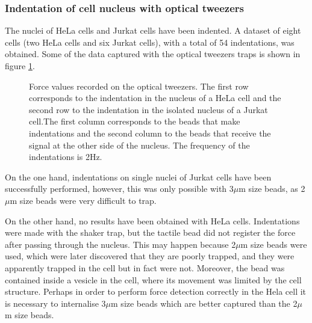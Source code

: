 \documentclass[12pt, a4paper]{article} %
\begin{document}
	\setlength{\parskip}{0mm}
	
	\subsubsection{Indentation of cell nucleus with optical tweezers}
	
	The nuclei of HeLa cells and Jurkat cells have been indented. A dataset of eight cells (two HeLa cells and six Jurkat cells), with a total of 54 indentations, was obtained. Some of the data captured with the optical tweezers traps is shown in figure \ref{fig:raw_data_cells}.
	
	\setlength{\parskip}{4mm}
	
	\begin{figure}[htbp]
		\centering
		
		\caption{Force values recorded on the optical tweezers. The first row corresponds to the indentation in the nucleus of a HeLa cell and the second row to the indentation in the isolated nucleus of a Jurkat cell.The first column corresponds to the beads that make indentations and the second column to the beads that receive the signal at the other side of the nucleus. The frequency of the indentations is 2Hz.}
		\label{fig:raw_data_cells}
	\end{figure}
	On the one hand, indentations on single nuclei of Jurkat cells have been successfully performed, however, this was only possible with 3$\mu$m size beads, as 2$\mu$m size beads were very difficult to trap. 
	
	On the other hand, no results have been obtained with HeLa cells. Indentations were made with the shaker trap, but the tactile bead did not register the force after passing through the nucleus. This may happen because 2$\mu$m size beads were used, which were later discovered that they are poorly trapped, and they were apparently trapped in the cell but in fact were not. Moreover, the bead was contained inside a vesicle in the cell, where its movement was limited by the cell structure. Perhaps in order to perform force detection correctly in the Hela cell it is necessary to internalise 3$\mu$m size beads which are better captured than the 2$\mu$m size beads.
	\setlength{\parskip}{0mm}
	
\end{document}
